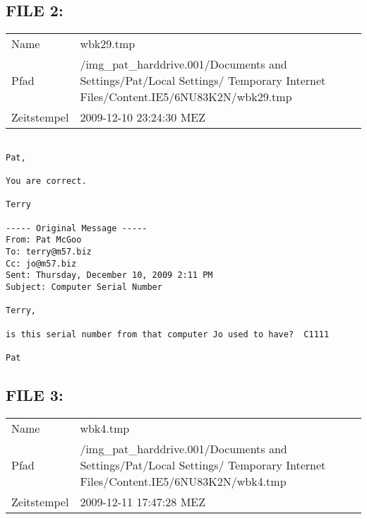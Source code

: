 \subsection{FILE 2:}
\label{sec:pat_emails_2}	

\begin{table}[htb]
	\begin{tabular}{p{2cm} p{13.5cm}}
		Name & wbk29.tmp\\
		Pfad & /img_pat_harddrive.001/Documents and Settings/Pat/Local Settings/ Temporary Internet Files/Content.IE5/6NU83K2N/wbk29.tmp\\
		Zeitstempel & 2009-12-10 23:24:30 MEZ
	\end{tabular}
\end{table}	

\begin{lstlisting}

Pat,

You are correct.

Terry

----- Original Message -----
From: Pat McGoo
To: terry@m57.biz
Cc: jo@m57.biz
Sent: Thursday, December 10, 2009 2:11 PM
Subject: Computer Serial Number

Terry,

is this serial number from that computer Jo used to have?  C1111

Pat
\end{lstlisting}

\subsection{FILE 3:}
\label{sec:pat_emails_3}	

\begin{table}[htb]
	\begin{tabular}{p{2cm} p{13.5cm}}
		Name & wbk4.tmp\\
		Pfad & /img_pat_harddrive.001/Documents and Settings/Pat/Local Settings/ Temporary Internet Files/Content.IE5/6NU83K2N/wbk4.tmp\\
		Zeitstempel & 2009-12-11 17:47:28 MEZ
	\end{tabular}
\end{table}	

